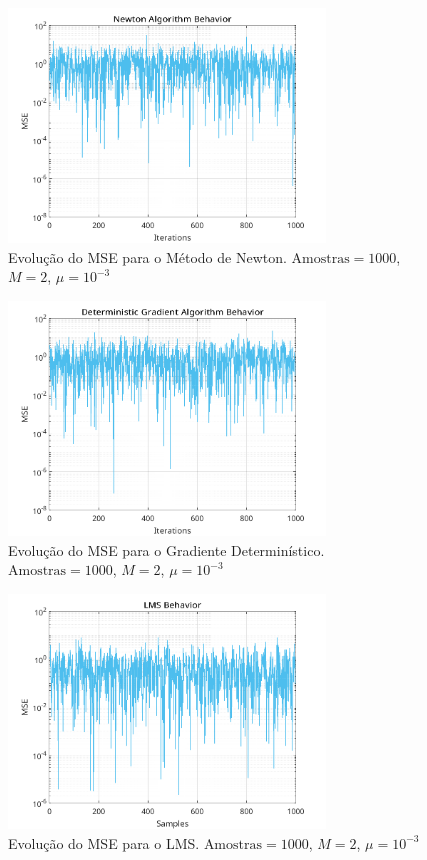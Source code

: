 \documentclass[a4paper,10pt]{article}
\begin{document}
\begin{enumerate}
				\begin{figure}[H]
					\centering
					\includegraphics[width=0.75\textwidth]{figs/newton_mse.png}
					\caption{Evolução do MSE para o Método de Newton. $\text{Amostras} = 1000$, $M = 2$, $\mu = 10^{-3}$}
					\label{fig:newton_mse}
				\end{figure}
				
				\begin{figure}[H]
					\centering
					\includegraphics[width=0.75\textwidth]{figs/gradient_mse.png}
					\caption{Evolução do MSE para o Gradiente Determinístico. $\text{Amostras} = 1000$, $M = 2$, $\mu = 10^{-3}$}
					\label{fig:gradient_mse}
				\end{figure}

				\begin{figure}[H]
					\centering
					\includegraphics[width=0.75\textwidth]{figs/lms_mse.png}
					\caption{Evolução do MSE para o LMS. $\text{Amostras}  = 1000$, $M = 2$, $\mu = 10^{-3}$}
					\label{fig:lms_mse}
				\end{figure}


\end{enumerate}
\end{document}
